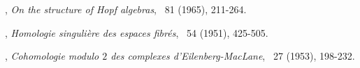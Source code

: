 \begin{thebibliography}{99}
, \textit{On the structure of Hopf algebras}, \ANNMAone\ 81 (1965), 211-264.











, \textit{Homologie singuli\`ere des espaces fibr\' es}, \ANNMAone\ 54 (1951), 425-505.

, \textit{Cohomologie modulo $2$ des complexes d'Eilenberg-MacLane}, \COMMH\ 27 (1953), 198-232.



\end{thebibliography}
